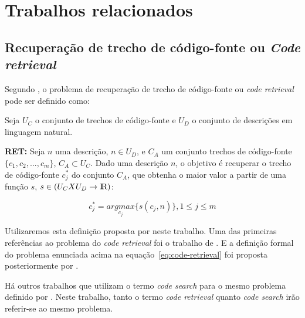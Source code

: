 \chapter{Trabalhos relacionados}
\label{cap:trabalhos-relacionados}



\section{Recuperação de trecho de código-fonte ou \textit{Code retrieval}}
\label{sec:code-retrieval}

Segundo \cite{iyer-etal-2016-summarizing}, o problema de recuperação de trecho de código-fonte ou \textit{code retrieval} pode ser definido como:

Seja $U_{C}$ o conjunto de trechos de código-fonte e $U_{D}$ o conjunto de descrições em linguagem natural. 

\textbf{RET:} Seja $n$ uma descrição, $n \in U_{D}$, e $C_{A}$ um conjunto trechos de código-fonte $\{c_{1}, c_{2}, ..., c_{m}\}$, $C_{A} \subset U_{C}$. Dado uma descrição $n$, o objetivo é recuperar o trecho de código-fonte $c_{j}^{*}$ do conjunto $C_{A}$, que obtenha o maior valor a partir de uma função $s$, $s \in (U_{C} X U_{D} \rightarrow \rm I\!R)$:

\begin{equation}\label{eq:code-retrieval}
c_{j}^{*} = \underset{c_{j}}{argmax} \{s(c_{j} , n)\}, 1 \leq j \leq m   
\end{equation}


Utilizaremos esta definição proposta por \cite{iyer-etal-2016-summarizing} neste trabalho. Uma das primeiras referências ao problema do \textit{code retrieval} foi o trabalho de \cite{Allamanis-bimodal-source-code-natural-language:2015}. E a definição formal do problema enunciada acima na equação~\ref{eq:code-retrieval} foi proposta posteriormente por \cite{iyer-etal-2016-summarizing}. 

Há outros trabalhos que utilizam o termo \textit{code search} para o mesmo problema definido por \cite{iyer-etal-2016-summarizing}. Neste trabalho, tanto o termo \textit{code retrieval} quanto \textit{code search} irão referir-se ao mesmo problema.




